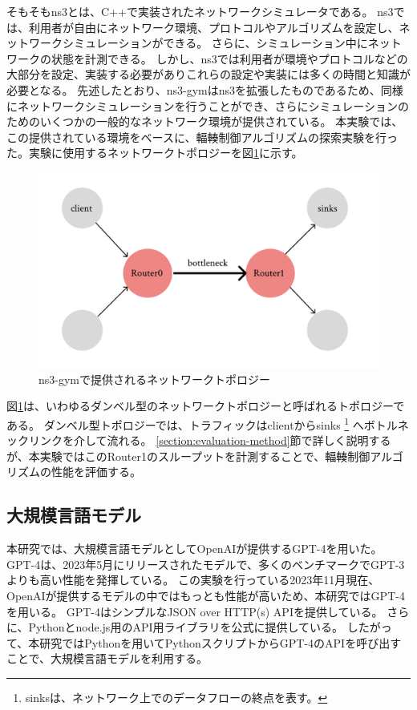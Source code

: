 \documentclass[a4paper,11pt]{jreport}
\newcommand{\figref}[1]{図\ref{#1}}
\newcommand{\secref}[1]{\ref{#1}節}
\begin{document}
そもそもns3とは、C++で実装されたネットワークシミュレータである。
ns3では、利用者が自由にネットワーク環境、プロトコルやアルゴリズムを設定し、ネットワークシミュレーションができる。
さらに、シミュレーション中にネットワークの状態を計測できる。
しかし、ns3では利用者が環境やプロトコルなどの大部分を設定、実装する必要がありこれらの設定や実装には多くの時間と知識が必要となる。
先述したとおり、ns3-gymはns3を拡張したものであるため、同様にネットワークシミュレーションを行うことができ、さらにシミュレーションのためのいくつかの一般的なネットワーク環境が提供されている。
本実験では、この提供されている環境をベースに、輻輳制御アルゴリズムの探索実験を行った。実験に使用するネットワークトポロジーを\figref{figure:network-topology}に示す。
\begin{figure}[htbp]
  \centering
  \includegraphics[width=0.6\linewidth]{fig/chap04/network-topology.png}
  \caption{ns3-gymで提供されるネットワークトポロジー}
  \label{figure:network-topology}
\end{figure}
\figref{figure:network-topology}は、いわゆるダンベル型のネットワークトポロジーと呼ばれるトポロジーである。
ダンベル型トポロジーでは、トラフィックはclientからsinks
\footnote{sinksは、ネットワーク上でのデータフローの終点を表す。}
へボトルネックリンクを介して流れる。
\secref{section:evaluation-method}で詳しく説明するが、本実験ではこのRouter1のスループットを計測することで、輻輳制御アルゴリズムの性能を評価する。

\subsection{大規模言語モデル}

本研究では、大規模言語モデルとしてOpenAIが提供するGPT-4を用いた。
GPT-4\cite{gpt4}は、2023年5月にリリースされたモデルで、多くのベンチマークでGPT-3よりも高い性能を発揮している。
この実験を行っている2023年11月現在、OpenAIが提供するモデルの中ではもっとも性能が高いため、本研究ではGPT-4を用いる。
GPT-4はシンプルなJSON over HTTP(s) APIを提供している。
さらに、Pythonとnode.js用のAPI用ライブラリを公式に提供している。
したがって、本研究ではPythonを用いてPythonスクリプトからGPT-4のAPIを呼び出すことで、大規模言語モデルを利用する。
\end{document}
